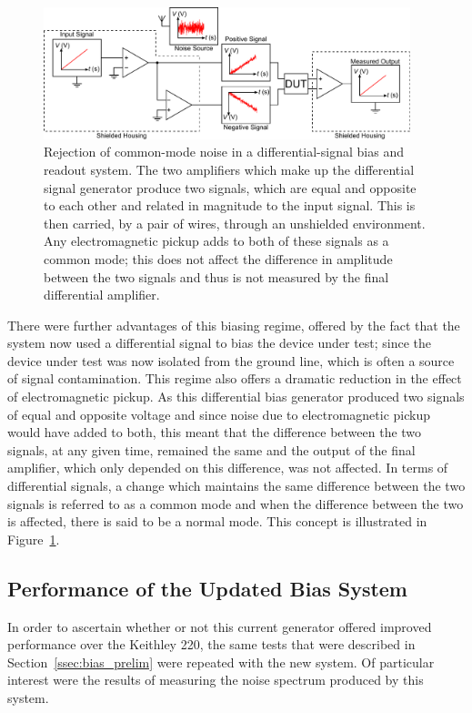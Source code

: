 \begin{figure}[t]
\begin{center}
\includegraphics[width = 0.95\textwidth]{figures/differential_noise}
\caption[Rejection of common-mode noise in a differential bias and readout system]{Rejection of common-mode noise in a differential-signal bias and readout system. The two amplifiers which make up the differential signal generator produce two signals, which are equal and opposite to each other and related in magnitude to the input signal. This is then carried, by a pair of wires, through an unshielded environment. Any electromagnetic pickup adds to both of these signals as a common mode; this does not affect the difference in amplitude between the two signals and thus is not measured by the final differential amplifier.}
\label{fig:differential_noise_rejection}
\end{center}
\end{figure}
There were further advantages of this biasing regime, offered by the fact that the system now used a differential signal to bias the device under test; since the device under test was now isolated from the ground line, which is often a source of signal contamination. This regime also offers a dramatic reduction in the effect of electromagnetic pickup. As this differential bias generator produced two signals of equal and opposite voltage and since noise due to electromagnetic pickup would have added to both, this meant that the difference between the two signals, at any given time, remained the same and the output of the final amplifier, which only depended on this difference, was not affected. In terms of differential signals, a change which maintains the same difference between the two signals is referred to as a common mode and when the difference between the two is affected, there is said to be a normal mode. This concept is illustrated in Figure~\ref{fig:differential_noise_rejection}.

\subsection{Performance of the Updated Bias System}
\label{ssec:RTD_bias_performance} 
In order to ascertain whether or not this current generator offered improved performance over the Keithley 220, the same tests that were described in Section~\ref{ssec:bias_prelim} were repeated with the new system. Of particular interest were the results of measuring the noise spectrum produced by this system.

